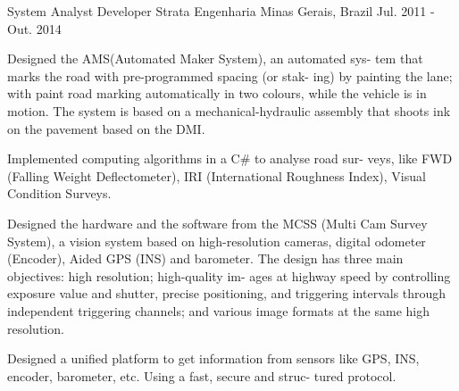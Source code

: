 \begin{cventries}
  \cventry
    {System Analyst Developer} %
    {Strata Engenharia} %
    {Minas Gerais, Brazil} %
    {Jul. 2011 - Out. 2014} %
    {
      \begin{cvitems} %
        \item {Designed the AMS(Automated Maker System), an automated sys-
tem that marks the road with pre-programmed spacing (or stak-
ing) by painting the lane; with paint road marking automatically in
two colours, while the vehicle is in motion. The system is based on
a mechanical-hydraulic assembly that shoots ink on the pavement
based on the DMI.}
        \item {Implemented computing algorithms in a C\# to analyse road sur-
veys, like FWD (Falling Weight Deflectometer), IRI (International
Roughness Index), Visual Condition Surveys.}
        \item {Designed the hardware and the software from the MCSS (Multi Cam
Survey System), a vision system based on high-resolution cameras,
digital odometer (Encoder), Aided GPS (INS) and barometer. The
design has three main objectives: high resolution; high-quality im-
ages at highway speed by controlling exposure value and shutter,
precise positioning, and triggering intervals through independent
triggering channels; and various image formats at the same high
resolution.}
		\item {Designed a unified platform to get information from sensors like
GPS, INS, encoder, barometer, etc. Using a fast, secure and struc-
tured protocol.}
      \end{cvitems}
    }


\end{cventries}
